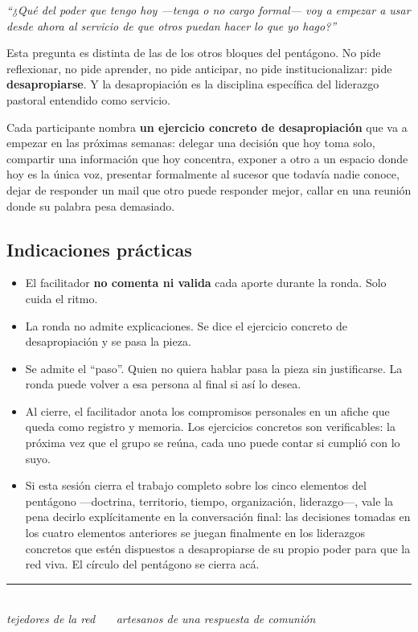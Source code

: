 \documentclass[11pt, a4paper]{article}
\begin{document}
\begin{center}
\begin{tcolorbox}[
  enhanced, colback=liderazgoVino, colframe=liderazgoVino,
  boxrule=0pt, arc=3pt,
  left=18pt, right=18pt, top=16pt, bottom=16pt,
  width=0.90\linewidth,
  halign=center
]
  {\color{parch}\itshape\large ``¿Qué del poder que tengo hoy ---tenga o no cargo formal--- voy a empezar a usar desde ahora al servicio de que otros puedan hacer lo que yo hago?''}
\end{tcolorbox}
\end{center}

\vspace{0.5em}

Esta pregunta es distinta de las de los otros bloques del pentágono. No pide reflexionar, no pide aprender, no pide anticipar, no pide institucionalizar: pide \textbf{desapropiarse}. Y la desapropiación es la disciplina específica del liderazgo pastoral entendido como servicio.

Cada participante nombra \textbf{un ejercicio concreto de desapropiación} que va a empezar en las próximas semanas: delegar una decisión que hoy toma solo, compartir una información que hoy concentra, exponer a otro a un espacio donde hoy es la única voz, presentar formalmente al sucesor que todavía nadie conoce, dejar de responder un mail que otro puede responder mejor, callar en una reunión donde su palabra pesa demasiado.

\subsection*{Indicaciones prácticas}

\begin{itemize}
  \item El facilitador \textbf{no comenta ni valida} cada aporte durante la ronda. Solo cuida el ritmo.
  \item La ronda no admite explicaciones. Se dice el ejercicio concreto de desapropiación y se pasa la pieza.
  \item Se admite el ``paso''. Quien no quiera hablar pasa la pieza sin justificarse. La ronda puede volver a esa persona al final si así lo desea.
  \item Al cierre, el facilitador anota los compromisos personales en un afiche que queda como registro y memoria. Los ejercicios concretos son verificables: la próxima vez que el grupo se reúna, cada uno puede contar si cumplió con lo suyo.
  \item Si esta sesión cierra el trabajo completo sobre los cinco elementos del pentágono ---doctrina, territorio, tiempo, organización, liderazgo---, vale la pena decirlo explícitamente en la conversación final: las decisiones tomadas en los cuatro elementos anteriores se juegan finalmente en los liderazgos concretos que estén dispuestos a desapropiarse de su propio poder para que la red viva. El círculo del pentágono se cierra acá.
\end{itemize}

\vspace{2em}

\begin{center}
{\color{regla}\rule{0.35\linewidth}{0.5pt}}\\
\vspace{0.6em}
{\color{tenue}\itshape\small tejedores de la red \ \textbullet\ \ artesanos de una respuesta de comunión}
\end{center}
\end{document}
